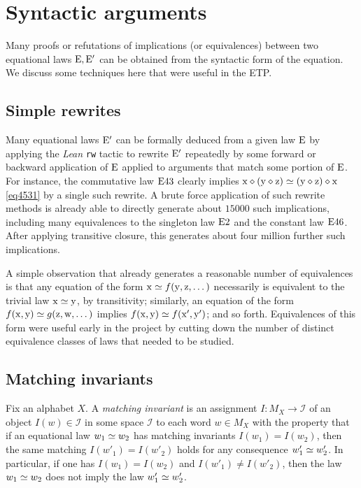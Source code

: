 
\section{Syntactic arguments}\label{syntactic-sec}

Many proofs or refutations of implications (or equivalences) between two equational laws $\mathrm{E},\mathrm{E}'$ can be obtained from the syntactic form of the equation.  We discuss some techniques here that were useful in the ETP.

\subsection{Simple rewrites}\label{rewrite-sec}

Many equational laws $\mathrm{E}'$ can be formally deduced from a given law $\mathrm{E}$ by applying the \emph{Lean} \texttt{rw} tactic to rewrite $\mathrm{E}'$ repeatedly by some forward or backward application of $\mathrm{E}$ applied to arguments that match some portion of $\mathrm{E}$.  For instance, the commutative law $\mathrm{E}43$ clearly implies $\mathrm{x} \diamond (\mathrm{y} \diamond \mathrm{z}) \simeq (\mathrm{y} \diamond \mathrm{z}) \diamond \mathrm{x}$ \eqref{eq4531}
by a single such rewrite.  A brute force application of such rewrite methods is already able to directly generate about $\num{15000}$ such implications, including many equivalences to the singleton law $\mathrm{E}2$ and the constant law $\mathrm{E}46$.  After applying transitive closure, this generates about four million further such implications.

A simple observation that already generates a reasonable number of equivalences is that any equation of the form $\mathrm{x} \simeq f(\mathrm{y},\mathrm{z},\dots)$ necessarily is equivalent to the trivial law $\mathrm{x} \simeq \mathrm{y}$, by transitivity; similarly, an equation of the form $f(\mathrm{x},\mathrm{y}) \simeq g(\mathrm{z},\mathrm{w},\dots)$ implies $f(\mathrm{x},\mathrm{y}) \simeq f(\mathrm{x}',\mathrm{y}')$; and so forth.  Equivalences of this form were useful early in the project by cutting down the number of distinct equivalence classes of laws that needed to be studied.

\subsection{Matching invariants}

Fix an alphabet $X$. A \emph{matching invariant} is an assignment $I \colon M_X \to {\mathcal I}$ of an object $I(w) \in {\mathcal I}$ in some space ${\mathcal I}$ to each word $w \in M_X$ with the property that if an equational law $w_1 \simeq w_2$ has matching invariants $I(w_1)=I(w_2)$, then the same matching $I(w'_1) = I(w'_2)$ holds for any consequence $w'_1 \simeq w'_2$.  In particular, if one has $I(w_1)=I(w_2)$ and $I(w'_1) \neq I(w'_2)$, then the law $w_1 \simeq w_2$ does not imply the law $w'_1 \simeq w'_2$.

